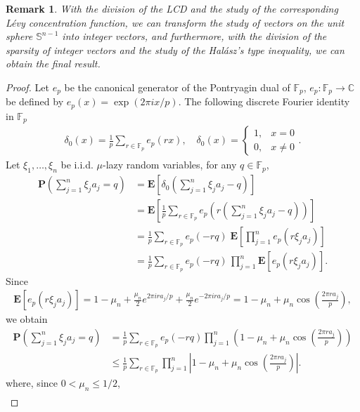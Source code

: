 \documentclass{article}
\numberwithin{equation}{section}
\theoremstyle{plain}
\newtheorem{myrem}{Remark}[section]
\begin{document}
\begin{myrem}
With the division of the LCD and the study of the corresponding L\'{e}vy concentration function, we can transform the study of vectors on the unit sphere $\mathbb{S}^{n-1}$ into integer vectors, and furthermore, with the division of the sparsity of integer vectors and the study of the Hal\'{a}sz’s type inequality, we can obtain the final result.
\end{myrem}
\begin{proof}
Let $e_p$ be the canonical generator of the Pontryagin dual of $\mathbb{F}_p$,  $e_p:\mathbb{F}_p \rightarrow \mathbb{C}$ be defined by $e_p(x)=\exp(2\pi ix/p)$. The following discrete Fourier identity in $\mathbb{F}_p$
\begin{align*}
  \delta_0(x)=\frac1p\sum_{r\in\mathbb{F}_p}e_p(r x),  \quad
  \delta_0(x)=
  \begin{cases}
    1,&x=0\\
    0,&x\neq0
  \end{cases} .
\end{align*}
Let $\xi_1,\dots,\xi_n$ be i.i.d. $\mu$-lazy random variables, for any $q\in\mathbb{F}_p$,
\begin{align*}
\textbf{P}\left(\sum_{j=1}^n\xi_ja_j = q\right)
&= \textbf{E}\left[\delta_0\left(\sum_{j=1}^n\xi_ja_j - q\right)\right]\\
& = \textbf{E}\left[\frac1p\sum_{r\in\mathbb{F}_p}e_p\left(r(\sum_{j=1}^n\xi_ja_j - q)\right)\right]\\
&= \frac1p\sum_{r\in\mathbb{F}_p}e_p(-r q)\;
     \textbf{E}\left[\prod_{j=1}^n e_p(r\xi_ja_j)\right]\\
&= \frac1p\sum_{r\in\mathbb{F}_p}e_p(-r q)\,
\prod_{j=1}^n \textbf{E}\left[e_p(r\xi_ja_j)\right].
\end{align*}
Since
\begin{align*}
  \textbf{E}\left[e_p(r\xi_ja_j)\right]
  =1-\mu_{n}
   +\frac{\mu_{n}}{2}e^{2\pi ir a_j/p}
   +\frac{\mu_{n}}{2}e^{-2\pi ir a_j/p}
  =1-\mu_{n}+\mu_{n}\cos(\frac{2\pi ra_j}{p}),
\end{align*}
we obtain
\begin{align*}
  \textbf{P}\left(\sum_{j=1}^n\xi_ja_j=q\right)
  &=\frac1p\sum_{r\in\mathbb{F}_p}e_p(-r q)
    \prod_{j=1}^n\left(1-\mu_{n}+\mu_{n}\cos(\frac{2\pi ra_j}{p})\right)\\
  &\le \frac1p\sum_{r\in\mathbb{F}_p}
    \prod_{j=1}^n\left|1-\mu_{n}+\mu_{n}\cos(\frac{2\pi ra_j}{p})\right|.
\end{align*}
where, since $0<\mu_{n}\le1/2$,
\begin{align}\label{Hal6}

\end{align}
\end{proof}
\end{document}
